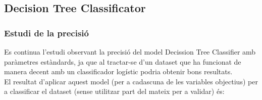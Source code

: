 \documentclass[a4paper, 11pt]{article}
\begin{document}
\newpage


\subsection{Decision Tree Classificator}\label{TREE}
\subsubsection{Estudi de la precisió}
Es continua l'estudi observant la precisió del model Decission Tree Classifier amb paràmetres estàndards, ja que al tractar-se d'un dataset que ha funcionat de manera decent amb un classificador logístic podria obtenir bons resultats.\\
El resultat d'aplicar aquest model (per a cadascuna de les variables objectius) per a classificar el dataset (sense utilitzar part del mateix per a validar) és:
\end{document}
